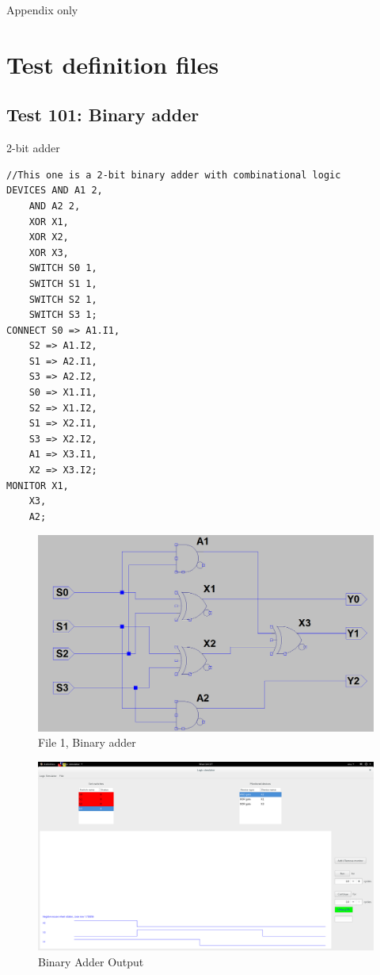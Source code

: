 \documentclass[12pt]{article}
\begin{document}
Appendix only

\appendix
\section{Test definition files}
\subsection{Test 101: Binary adder}
2-bit adder\\
\begin{verbatim}
//This one is a 2-bit binary adder with combinational logic
DEVICES	AND A1 2,
	AND A2 2,
	XOR X1,
	XOR X2,
	XOR X3,
	SWITCH S0 1,
	SWITCH S1 1,
	SWITCH S2 1,
	SWITCH S3 1;
CONNECT	S0 => A1.I1,
	S2 => A1.I2,
	S1 => A2.I1,
	S3 => A2.I2,
	S0 => X1.I1,
	S2 => X1.I2,
	S1 => X2.I1,
	S3 => X2.I2,
	A1 => X3.I1,
	X2 => X3.I2;
MONITOR	X1,
	X3,
	A2;
\end{verbatim}

\begin{figure}[H]
  \centering
  \includegraphics[width=0.9\linewidth]{figures/Test101.png}
  \captionsetup{width=.7\linewidth}
  \caption{File 1, Binary adder}
  \label{fig:1}
\end{figure}
\begin{figure}[H]
	\centering
	\includegraphics[width=0.9\linewidth]{figures/101_OUTPUT.png}
	\captionsetup{width=.7\linewidth}
	\caption{Binary Adder Output}
	\label{fig:2}
\end{figure}
\end{document}
